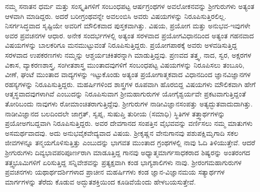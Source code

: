 ನಮ್ಮ ಸನಾತನ ಧರ್ಮ ಮತ್ತು ಸಂಸ್ಕೃತಿಗಳಿಗೆ ಸಂಬಂಧಪಟ್ಟ ಆರ್ಷಗ್ರಂಥಗಳ ಅವಲೋಕನವನ್ನು ಶ್ರೀಗುರುಗಳು ಅತ್ಯಂತ ಆಳವಾಗಿ ಮಾಡಿದ್ದರು. ಅದರೆ ಬರೀಗ್ರಂಥವನ್ನೇ ಅವಲಂಬಿಸಿ ಅವರು ವಿಷಯಗಳನ್ನು ನಿರೂಪಿಸುತ್ತಿರಲಿಲ್ಲ. ನಿಸರ್ಗಸಿದ್ಧವಾದ ಸೃಷ್ಟಿಯೇ ಅವರಿಗೆ ಮೌಲಿಕವಾದ ಪುಸ್ತಕವಾಗಿತ್ತು. ವಿಷಯ, ಪ್ರಯೋಗ ಮತ್ತು ಅನುಭವ-ಇವುಗಳೇ ಅವರ ಪ್ರವಚನಗಳ ಆಧಾರ. ಅನೇಕ ಸಂದರ್ಭಗಳಲ್ಲಿ ಅತ್ಯಂತ ಸರಳವಾದ ಪ್ರಯೋಗವಿಧಾನದಿಂದ ಅತ್ಯಂತ ಗಹನವಾದ ವಿಷಯಗಳನ್ನು ಬಾಲಕರಿಗೂ ಮನಮುಟ್ಟುವಂತೆ ನಿರೂಪಿಸುತ್ತಿದ್ದರು. ಪ್ರಯೋಗಪಾಠಕ್ಕೆ  ಅವರು ಅಳವಡಿಸುತ್ತಿದ್ದ ಸರಳವಾದ ಉಪಕರಣಗಳು ನಮ್ಮನ್ನು ಆಶ್ಚರ್ಯಚಕಿತರನ್ನಾಗಿ ಮಾಡುತ್ತಿದ್ದವು. ಪ್ರಣವದ ತತ್ತ್ವ, ನಾದ, ಸ್ವರ, ಅಕ್ಷರಗಳ ವಿಕಾಸ, ವ್ಯಾಕರಣಶಾಸ್ತ್ರ, ಸಂಗೀತಶಾಸ್ತ್ರ ಮುಂತಾದವುಗಳಿಗೆ ಸಂಬಂಧಪಟ್ಟ ವಿಷಯಗಳನ್ನು ನಿರೂಪಿಸಲು ತಂಬೂರಿ, ವೀಣೆ, ಘಂಟೆ ಮುಂತಾದ ವಾದ್ಯಗಳನ್ನು ಇಟ್ಟುಕೊಂಡು ಅತ್ಯಂತ ಪ್ರಯೋಗಾತ್ಮಕವಾದ ವಿಧಾನದಿಂದ ಜ್ಞಾನವಿಜ್ಞಾನಗಳ ರಹಸ್ಯಗಳನ್ನು  ನಿರೂಪಿಸುತ್ತಿದ್ದರು. ಮಹರ್ಷಿಗಳಿಂದ ಶಾಸ್ತ್ರಗಳ ರೂಪವಾಗಿ ಹೊರಬಿದ್ದ ವಿಷಯಗಳು ಮೌಲಿಕವಾಗಿ ಹೇಗೆ ಆತ್ಮಸ್ಥವಾದವುಗಳಾಗಿವೆ ಎಂಬುದನ್ನು ನಿರೂಪಿಸುವಾಗ ಶ್ರೀಮಹಾಗುರುಗಳ ಯೋಗೈಶ್ವರ್ಯವೇ ಪ್ರಕಟವಾಗುತ್ತಿದ್ದಂತೆ ತೋರಿಬಂದು ನಾವುಗಳು ರೋಮಾಂಚಿತರಾಗುತ್ತಿದ್ದೆವು. ಶ್ರೀಗುರುಗಳ ನಾಡೀವಿಜ್ಞಾನಸಂಪತ್ತು ಅತ್ಯದ್ಭುತವಾದುದಾಗಿತ್ತು. ನಾಡೀವಿಜ್ಞಾನದ ಬಲದಿಂದಲೇ ಜಾಗ್ರತ್, ಸ್ವಪ್ನ, ಸುಷುಪ್ತಿ ತುರೀಯ (ಸಮಾಧಿ) ಸ್ಥಿತಿಗಳ ತತ್ತ್ವಾರ್ಥಗಳನ್ನು ಪ್ರಯೋಅಗಬದ್ದವಾಗಿ ನಿರೂಪಿಸುತ್ತಿದ್ದರು. ಅವರ ದೇವಗಾನದ ಸಂಪತ್ತಿನ ವೈಭವವನ್ನು ವರ್ಣಿಸಲು ನಮ್ಮ ಮಾತುಗಳು ಅಸಮರ್ಥವಾದವು. ಅದು ಅನುಭವೈಕವೇದ್ಯವಾದ ವಿಷಯ. ಶ್ರೀಕೃಷ್ಣನ ವೇನುಗಾನವು ಪಶುಪಕ್ಷಿಮೃಗಾದಿ ಸಕಲ ಜೀವಗಳನ್ನೂ ತನ್ಮಯಗೊಳಿಸುತ್ತಿತ್ತು ಎಂಬುದನ್ನು  ಭಾಗವತ ಮುಂತಾದ ಗ್ರಂಥಗಳಲ್ಲಿ ನಾವು ಓದಿ ತಿಳಿಯುತ್ತೇವೆ. ಆದರೆ ಶ್ರೀಗುರುಗಳು ದಿವ್ಯಭಾವಪರಿಪೂರ್ಣರಾಗಿ ಮಾಡೂತ್ತಿದ್ದ ಗಾನವು ಅಧ್ಯಾತ್ಮಮಾರ್ಗಸಾಧಕರಾದ ಶಿಷ್ಯರನ್ನು ಅಂತರಂಗದ ತತ್ತ್ವಭೂಮಿಗಳಿಗೆ ಏರಿಸುತ್ತಿದ್ದ ಸನ್ನಿವೇಶವನ್ನು ಪ್ರತ್ಯಕ್ಷವಾಗಿ ಕಂಡ ಭಾಗ್ಯಶಾಲಿಗಳು ನಾವು. ಶ್ರೀರಂಗಮಹಾಗುರುಗಳ ಪ್ರವಚನಗಳು ಯಥಾರ್ಥದರ್ಶಿಗಳಾದ ಪ್ರಾಚೀನ ಮಹರ್ಷಿಗಳು ಕಂಡ ಜ್ಞಾನ-ವಿಜ್ಞಾನಮಯ ಸತ್ಯಾರ್ಥಗಳ ಮಾರ್ಗಗಳನ್ನು ತೆರೆದು ಕೊಡುವ ಅದ್ಭುತಶಕ್ತಿಯಿಂದ ಕೂಡಿವೆಯೆಂದು ಹೇಳಬಯಸುತ್ತೇವೆ. 


